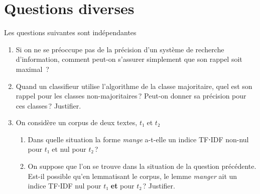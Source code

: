 \documentclass[a4paper, 11pt]{article}
\begin{document}
\section{Questions diverses}
Les questions suivantes sont indépendantes
\begin{enumerate}
    \item Si on ne se préoccupe pas de la précision d'un système de recherche d'information, comment peut-on s'assurer simplement que son rappel soit maximal ?
    \item Quand un classifieur utilise l'algorithme de la classe majoritaire, quel est son rappel pour les classes non-majoritaires ? Peut-on donner sa précision pour ces classes ? Justifier.
    \item On considère un corpus de deux textes, $t₁$ et $t₂$
        \begin{enumerate}
            \item Dans quelle situation la forme \emph{mange} a-t-elle un indice TF⋅IDF non-nul pour $t₁$ et nul pour $t₂$ ?
            \item On suppose que l'on se trouve dans la situation de la question précédente. Est-il possible qu'en lemmatisant le corpus, le lemme \emph{manger} ait un indice TF⋅IDF nul pour $t₁$ \textbf{et} pour $t₂$ ? Justifier.
        \end{enumerate}
\end{enumerate}
\end{document}
